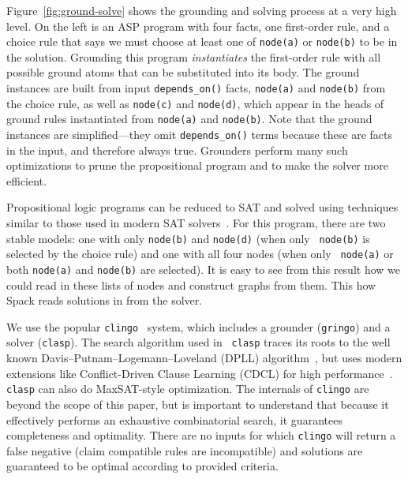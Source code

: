Figure~\ref{fig:ground-solve} shows the grounding and solving process at a very high
level. On the left is an ASP program with four facts, one first-order rule, and a choice
rule that says we must choose at least one of {\tt node(a)} or {\tt node(b)} to be in
the solution. Grounding this program {\it instantiates} the first-order rule with all
possible ground atoms that can be substituted into its body. The ground instances are
built from input {\tt depends\_on()} facts, {\tt node(a)} and {\tt node(b)} from the
choice rule, as well as {\tt node(c)} and {\tt node(d)}, which appear in the heads of
ground rules instantiated from {\tt node(a)} and {\tt node(b)}. Note that the ground
instances are simplified---they omit {\tt depends\_on()} terms because these are facts
in the input, and therefore always true. Grounders perform many such optimizations to
prune the propositional program and to make the solver more efficient.

Propositional logic programs can be reduced to SAT and solved using techniques similar
to those used in modern SAT solvers~\cite{gebser+:asp-book}. For this program, there are
two stable models: one with only {\tt node(b)} and {\tt node(d)} (when only {\tt
  node(b)} is selected by the choice rule) and one with all four nodes (when only {\tt
  node(a)} or both {\tt node(a)} and {\tt node(b)} are selected). It is easy to see from
this result how we could read in these lists of nodes and construct graphs from them.
This how Spack reads solutions in from the solver.

We use the popular {\tt clingo}~\cite{gebser+:aicomm11} system, which includes a
grounder ({\tt gringo}) and a solver ({\tt clasp}). The search algorithm used in {\tt
  clasp} traces its roots to the well known Davis–Putnam–Logemann–Loveland (DPLL)
algorithm~\cite{dp-sat,dpll-sat}, but uses modern extensions like Conflict-Driven Clause
Learning (CDCL) for high performance~\cite{moskewicz2001chaff}. {\tt clasp} can also
do MaxSAT-style optimization.
%
The internals of {\tt clingo} are beyond the scope of this paper, but is important to
understand that because it effectively performs an exhaustive combinatorial search, it
guarantees completeness and optimality. There are no inputs for which {\tt clingo} will
return a false negative (claim compatible rules are incompatible) and solutions
are guaranteed to be optimal according to provided criteria.
